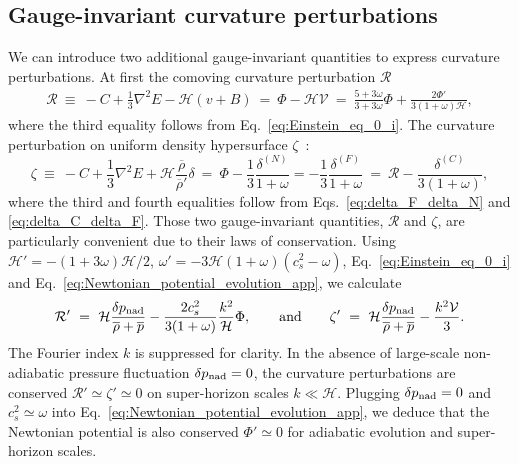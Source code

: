 \documentclass[twocolumn,superscriptaddress,aps,preprintnumbers,amsmath,amssymb,prl,footinbib]{revtex4-2}
\begin{document}
\subsection{Gauge-invariant curvature perturbations}
We can introduce two additional gauge-invariant quantities to express curvature perturbations. At first the comoving curvature perturbation $\mathcal{R}$~\cite{Bardeen:1980kt}
\begin{align}
\mathcal{R} ~\equiv ~ -C+\frac{1}{3}\nabla^2E-\mathcal{H}(v+B) ~=~\Phi - \mathcal{H}\mathcal{V} ~=~ \frac{5+3\omega}{3+3\omega} \Phi +\frac{2\Phi'}{3(1+\omega)\mathcal{H}},
\label{eq:mathcalR_def}
\end{align}
where the third equality follows from Eq.~\eqref{eq:Einstein_eq_0_i}.
The curvature perturbation on uniform density hypersurface $\zeta$~\cite{Bardeen:1983qw,Wands:2000dp,Lyth:2004gb}:
\begin{equation}
\label{eq:zeta_def}
\zeta ~\equiv ~ -C+\frac{1}{3}\nabla^2E+\mathcal{H}\frac{\overline{\rho}}{\overline{\rho}'}\delta ~=~ \Phi-\frac{1}{3}\frac{\delta^{(N)}}{1+\omega} = -\frac{1}{3}\frac{\delta^{(F)}}{1+\omega} ~=~ \mathcal{R}-\frac{\delta^{(C)}}{3(1+\omega)},
\end{equation}
where the third and fourth equalities follow from Eqs.~\eqref{eq:delta_F_delta_N} and \eqref{eq:delta_C_delta_F}. Those two gauge-invariant quantities, $\mathcal{R}$  and $\zeta$,  are particularly convenient due to their laws of conservation. Using $\mathcal{H}' = -(1+3\omega)\mathcal{H}/2$, $\omega'=-3\mathcal{H}(1+\omega)(c_s^2-\omega)$, Eq.~\eqref{eq:Einstein_eq_0_i} and Eq.~\eqref{eq:Newtonian_potential_evolution_app}, we calculate
\begin{align}
\label{eq:R_prime_Phi_prime}
\mathcal{R}' ~=~  \mathcal{H} \frac{\delta p_{\rm nad}}{\overline{\rho}+\overline{p}} - \frac{2c_s^2}{3(1+\omega)}\frac{k^2}{\mathcal{H}}\Phi,\qquad \textrm{and} \qquad\zeta' ~= ~ \mathcal{H} \frac{\delta p_{\rm nad}}{\overline{\rho}+\overline{p}} - \frac{k^2 \mathcal{V}}{3}.
\end{align}
The Fourier index $k$ is suppressed for clarity.
In the absence of large-scale non-adiabatic pressure fluctuation $\delta p_{\rm nad}=0$, the curvature perturbations are conserved $\mathcal{R}'\simeq \zeta'\simeq 0$ on super-horizon scales $k\ll \mathcal{H}$. Plugging $\delta p_{\rm nad}=0$ and $c_s^2\simeq \omega$ into Eq.~\eqref{eq:Newtonian_potential_evolution_app}, we deduce that the Newtonian potential is also conserved  $\Phi'\simeq 0$ for adiabatic evolution and super-horizon scales.
\end{document}
